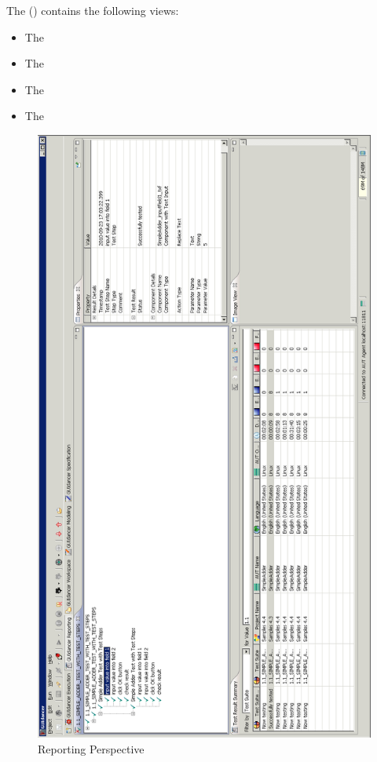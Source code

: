 The \reportpersp{} () contains the following views:

\begin{itemize}
\item The \gdtestresultview{}
\item The \gdpropview{} 
\item The \gdimgview{}
\item The \gdtestsummaryview{}
\end{itemize}


\begin{figure}
\includegraphics[width=12.5cm]{Userinterface/Editors/PS/reportingperspective}
\caption{\app{} Reporting Perspective}
\label{reportingperspective}
\end{figure}
\clearpage


